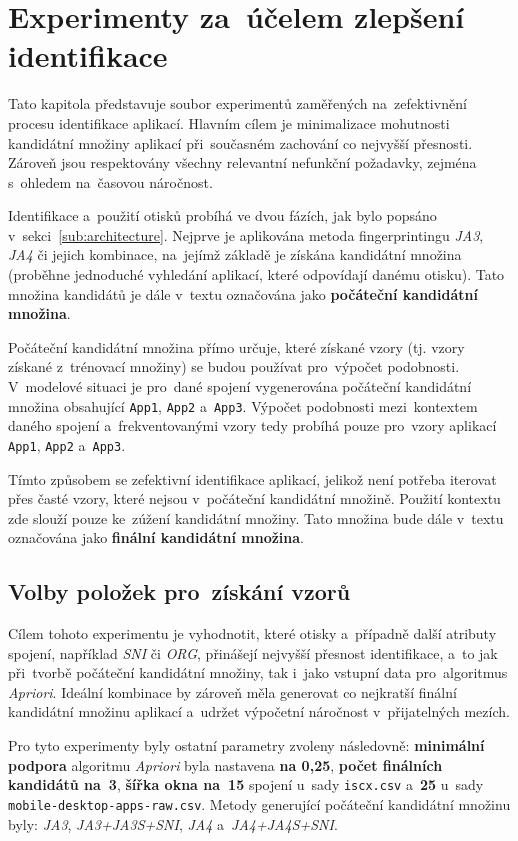\chapter{Experimenty za~účelem zlepšení identifikace}
\label{chp:exps}

Tato kapitola představuje soubor experimentů zaměřených na~zefektivnění procesu identifikace aplikací. Hlavním cílem je minimalizace mohutnosti kandidátní množiny aplikací při~současném zachování co nejvyšší přesnosti. Zároveň jsou respektovány všechny relevantní nefunkční požadavky, zejména s~ohledem na~časovou náročnost.

Identifikace a~použití otisků probíhá ve dvou fázích, jak bylo popsáno v~sekci~\ref{sub:architecture}. Nejprve je aplikována metoda fingerprintingu \textit{JA3}, \textit{JA4} či jejich kombinace, na~jejímž základě je získána kandidátní množina (proběhne jednoduché vyhledání aplikací, které odpovídají danému otisku). Tato množina kandidátů je dále v~textu označována jako \textbf{počáteční kandidátní množina}.

Počáteční kandidátní množina přímo určuje, které získané vzory (tj. vzory získané z~trénovací množiny) se budou používat pro~výpočet podobnosti. V~modelové situaci je pro~dané spojení vygenerována počáteční kandidátní množina obsahující \texttt{App1}, \texttt{App2} a~\texttt{App3}. Výpočet podobnosti mezi~kontextem daného spojení a~frekventovanými vzory tedy probíhá pouze pro~vzory aplikací \texttt{App1}, \texttt{App2} a~\texttt{App3}.

Tímto způsobem se zefektivní identifikace aplikací, jelikož není potřeba iterovat přes časté vzory, které nejsou v~počáteční kandidátní množině. Použití kontextu zde slouží pouze ke~zúžení kandidátní množiny. Tato množina bude dále v~textu označována jako \textbf{finální kandidátní množina}.

\section{Volby položek pro~získání vzorů}
\label{sec:ex1}
Cílem tohoto experimentu je vyhodnotit, které otisky a~případně další atributy spojení, například \textit{SNI} či \textit{ORG}, přinášejí nejvyšší přesnost identifikace, a~to jak při~tvorbě počáteční kandidátní množiny, tak i~jako vstupní data pro~algoritmus \textit{Apriori}. Ideální kombinace by zároveň měla generovat co nejkratší finální kandidátní množinu aplikací a~udržet výpočetní náročnost v~přijatelných mezích.

Pro tyto experimenty byly ostatní parametry zvoleny následovně: \textbf{minimální podpora} algoritmu \textit{Apriori} byla nastavena \textbf{na 0{,}25}, \textbf{počet finálních kandidátů na~3}, \textbf{šířka okna na~15} spojení u~sady \texttt{iscx.csv} a~\textbf{25} u~sady \texttt{mobile-desktop-apps-raw.csv}. Metody generující počáteční kandidátní množinu byly: \textit{JA3}, \textit{JA3+JA3S+SNI}, \textit{JA4} a~\textit{JA4+JA4S+SNI}.

